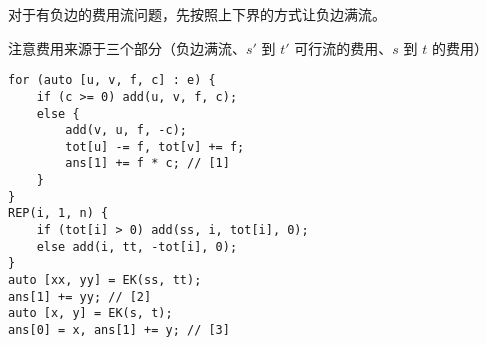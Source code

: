 对于有负边的费用流问题，先按照上下界的方式让负边满流。

注意费用来源于三个部分（负边满流、$s'$ 到 $t'$ 可行流的费用、$s$ 到 $t$ 的费用）

\begin{verbatim}
for (auto [u, v, f, c] : e) {
	if (c >= 0) add(u, v, f, c);
	else {
		add(v, u, f, -c);
		tot[u] -= f, tot[v] += f;
		ans[1] += f * c; // [1]
	}
}
REP(i, 1, n) {
	if (tot[i] > 0) add(ss, i, tot[i], 0);
	else add(i, tt, -tot[i], 0);
}
auto [xx, yy] = EK(ss, tt);
ans[1] += yy; // [2]
auto [x, y] = EK(s, t);
ans[0] = x, ans[1] += y; // [3]
\end{verbatim}
